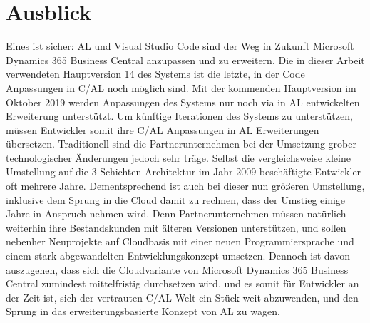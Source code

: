 \section{Ausblick}
Eines ist sicher: AL und Visual Studio Code sind der Weg in Zukunft Microsoft Dynamics 365 Business Central anzupassen und zu erweitern. Die in dieser Arbeit verwendeten Hauptversion 14 des Systems ist die letzte, in der Code Anpassungen in C/AL noch möglich sind. Mit der kommenden Hauptversion im Oktober 2019 werden Anpassungen des Systems nur noch via in AL entwickelten Erweiterung unterstützt. Um künftige Iterationen des Systems zu unterstützen, müssen Entwickler somit ihre C/AL Anpassungen in AL Erweiterungen übersetzen. Traditionell sind die Partnerunternehmen bei der Umsetzung grober technologischer Änderungen jedoch sehr träge. Selbst die vergleichsweise kleine Umstellung auf die 3-Schichten-Architektur im Jahr 2009 beschäftigte Entwickler oft mehrere Jahre. Dementsprechend ist auch bei dieser nun größeren Umstellung, inklusive dem Sprung in die Cloud damit zu rechnen, dass der Umstieg einige Jahre in Anspruch nehmen wird. Denn Partnerunternehmen müssen natürlich weiterhin ihre Bestandskunden mit älteren Versionen unterstützen, und sollen nebenher Neuprojekte auf Cloudbasis mit einer neuen Programmiersprache und einem stark abgewandelten Entwicklungskonzept umsetzen. Dennoch ist davon auszugehen, dass sich die Cloudvariante von Microsoft Dynamics 365 Business Central zumindest mittelfristig durchsetzen wird, und es somit für Entwickler an der Zeit ist, sich der vertrauten C/AL Welt ein Stück weit abzuwenden, und den Sprung in das  erweiterungsbasierte Konzept von AL zu wagen.

